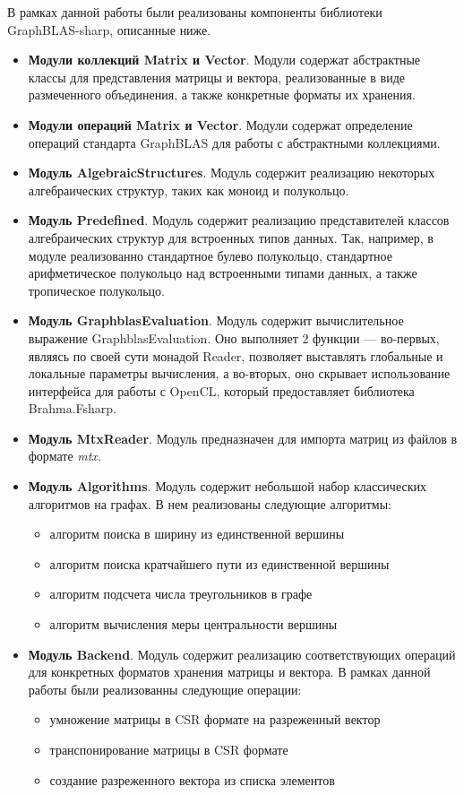 В рамках данной работы были реализованы компоненты библиотеки GraphBLAS-sharp, описанные ниже.
\begin{itemize}
    \item \textbf{Модули коллекций Matrix и Vector}. Модули содержат абстрактные классы для представления матрицы и вектора, реализованные в виде размеченного объединения, а также конкретные форматы их хранения.
    \item \textbf{Модули операций Matrix и Vector}. Модули содержат определение операций стандарта GraphBLAS для работы с абстрактными коллекциями.
    \item \textbf{Модуль AlgebraicStructures}. Модуль содержит реализацию не\-ко\-то\-рых алгебраических структур, таких как моноид и полукольцо.
    \item \textbf{Модуль Predefined}. Модуль содержит реализацию представителей классов алгебраических структур для встроенных типов данных. Так, например, в модуле реализованно стандартное булево полукольцо, стандартное арифметическое полукольцо над встроенными типами данных, а также тропическое полукольцо.
    \item \textbf{Модуль GraphblasEvaluation}. Модуль содержит вычислительное выражение GraphblasEvaluation. Оно выполняет 2 функции --- во-первых, являясь по своей сути монадой Reader, позволяет выставлять глобальные и локальные параметры вычисления, а во-вторых, оно скрывает использование интерфейса для работы с OpenCL, который предоставляет библиотека Brahma.Fsharp.
    \item \textbf{Модуль MtxReader}. Модуль предназначен для импорта матриц из файлов в формате \textit{mtx}.
    \item \textbf{Модуль Algorithms}. Модуль содержит небольшой набор классических алгоритмов на графах. В нем реализованы следующие алгоритмы: 
    \begin{itemize}
        \item алгоритм поиска в ширину из единственной вершины
        \item алгоритм поиска кратчайшего пути из единственной вершины
        \item алгоритм подсчета числа треугольников в графе
        \item алгоритм вычисления меры центральности вершины
    \end{itemize}
    \item \textbf{Модуль Backend}. Модуль содержит реализацию соответствующих операций для конкретных форматов хранения матрицы и вектора. В рамках данной работы были реализованны следующие операции:
    \begin{itemize}
        \item умножение матрицы в CSR формате на разреженный вектор
        \item транспонирование матрицы в CSR формате
        \item создание разреженного вектора из списка элементов
    \end{itemize}
\end{itemize}


